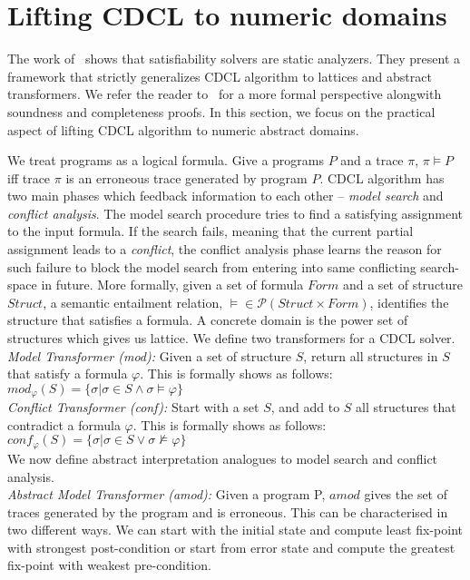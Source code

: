 \section{Lifting CDCL to numeric domains}
The work of~\cite{dhk2013-popl,sas12,tacas12} shows that 
satisfiability solvers are static analyzers. They present 
a framework that strictly generalizes CDCL algorithm to 
lattices and abstract transformers. We refer the reader 
to~\cite{dhk2013-popl} for a more formal perspective alongwith 
soundness and completeness proofs.  In this section, we focus 
on the practical aspect of lifting CDCL algorithm to numeric 
abstract domains.   

We treat programs as a logical formula. Give a programs $P$ and a trace $\pi$,
$\pi \models P$ iff trace $\pi$ is an erroneous trace generated by program
$P$. 
CDCL algorithm has two main phases which feedback information to 
each other -- {\em model search} and {\em conflict analysis}. The model 
search procedure tries to find a satisfying assignment to the input 
formula. If the search fails, meaning that the current partial assignment 
leads to a {\em conflict}, the conflict analysis phase learns the reason 
for such failure to block the model search from entering into same 
conflicting search-space in future. More formally, given a set of 
formula $Form$ and a set of structure $Struct$, a semantic entailment 
relation, $\models \in \mathcal{P}(Struct \times Form)$, identifies the 
structure that satisfies a formula. A concrete domain is the power set 
of structures which gives us lattice. 
We define two transformers for a CDCL solver. \\
\textit{Model Transformer (mod):} Given a set of structure $S$, return all structures 
in $S$ that satisfy a formula $\varphi$. This is formally shows as follows:
$mod_{\varphi}(S) = \{\sigma | \sigma \in S \wedge \sigma \models \varphi\}$ \\

\textit{Conflict Transformer (conf):} Start with a set $S$, and add to $S$ all structures 
that contradict a formula $\varphi$. This is formally shows as follows:
$conf_{\varphi}(S) = \{\sigma | \sigma \in S \vee \sigma \not\models \varphi\}$
\\
We now define abstract interpretation analogues to model search and conflict analysis.   \\
\textit{Abstract Model Transformer (amod):} Given a program P, $amod$ gives the 
set of traces generated by the program and is erroneous. This can be
characterised in two different ways. We can start with the initial state and
compute least fix-point with strongest post-condition or start from error state 
and compute the greatest fix-point with weakest pre-condition. \\

